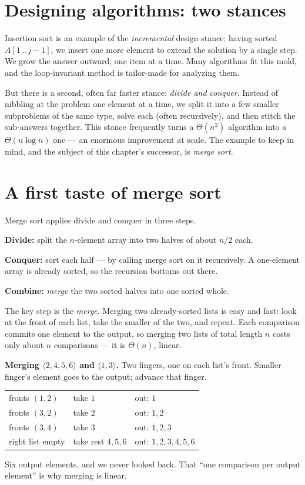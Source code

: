 \section{Designing algorithms: two stances}

Insertion sort is an example of the \emph{incremental} design stance: having sorted
$A[1\,..\,j-1]$, we insert one more element to extend the solution by a single step. We
grow the answer outward, one item at a time. Many algorithms fit this mold, and the
loop-invariant method is tailor-made for analyzing them.

But there is a second, often far faster stance: \emph{divide and conquer}. Instead
of nibbling at the problem one element at a time, we split it into a few smaller
subproblems of the same type, solve each (often recursively), and then stitch the
sub-answers together. This stance frequently turns a $\Theta(n^2)$ algorithm into a
$\Theta(n \log n)$ one --- an enormous improvement at scale. The example to keep in mind,
and the subject of this chapter's successor, is \emph{merge sort}.

\section{A first taste of merge sort}

Merge sort applies divide and conquer in three steps.

\begin{intuitionbox}
\textbf{Divide:} split the $n$-element array into two halves of about $n/2$ each.

\textbf{Conquer:} sort each half --- by calling merge sort on it recursively. A
one-element array is already sorted, so the recursion bottoms out there.

\textbf{Combine:} \emph{merge} the two sorted halves into one sorted whole.
\end{intuitionbox}

The key step is the \emph{merge}. Merging two already-sorted lists is
easy and fast: look at the front of each list, take the smaller of the two, and repeat.
Each comparison commits one element to the output, so merging two lists of total length
$n$ costs only about $n$ comparisons --- it is $\Theta(n)$, linear.

\begin{labbox}
\textbf{Merging $\langle 2,4,5,6\rangle$ and $\langle 1,3\rangle$.} Two fingers, one on
each list's front. Smaller finger's element goes to the output; advance that finger.

\smallskip
\begin{tabular}{l l l}
fronts $(1,2)$ & take $1$ & out: $1$ \\
fronts $(3,2)$ & take $2$ & out: $1,2$ \\
fronts $(3,4)$ & take $3$ & out: $1,2,3$ \\
right list empty & take rest $4,5,6$ & out: $1,2,3,4,5,6$ \\
\end{tabular}

\smallskip
Six output elements, and we never looked back. That ``one comparison per output
element'' is why merging is linear.
\end{labbox}

